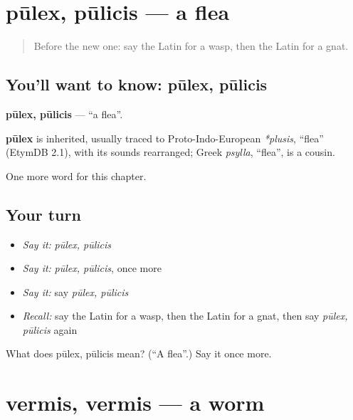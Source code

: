 \section[pūlex, pūlicis]{pūlex, pūlicis — a flea}

\label{lesson:LA-C276-pulex}



\begin{quote}
Before the new one: say the Latin for a wasp, then the Latin for a gnat.
\end{quote}

\subsection*{You'll want to know: pūlex, pūlicis}
\textbf{pūlex, pūlicis} — \textquotedblleft{}a flea\textquotedblright{}.

\begin{cousinweb}
\textbf{pūlex} is inherited, usually traced to Proto-Indo-European \emph{*plusis}, \textquotedblleft{}flea\textquotedblright{} (EtymDB 2.1), with its sounds rearranged; Greek \emph{psylla}, \textquotedblleft{}flea\textquotedblright{}, is a cousin.
\end{cousinweb}

\begin{grammarlens}[title={What you've built}]
One more word for this chapter.
\end{grammarlens}

\subsection*{Your turn}
\begin{itemize}
\raggedright
  \item \emph{Say it:} \emph{pūlex, pūlicis}
  \item \emph{Say it:} \emph{pūlex, pūlicis}, once more
  \item \emph{Say it:} say \emph{pūlex, pūlicis}
  \item \emph{Recall:} say the Latin for a wasp, then the Latin for a gnat, then say \emph{pūlex, pūlicis} again
\end{itemize}

\begin{tcolorbox}[breakable,colback=teal!4,colframe=teal!35!black,title={Before you move on}]
What does pūlex, pūlicis mean? (\textquotedblleft{}A flea\textquotedblright{}.) Say it once more.
\end{tcolorbox}
\section[vermis, vermis]{vermis, vermis — a worm}

